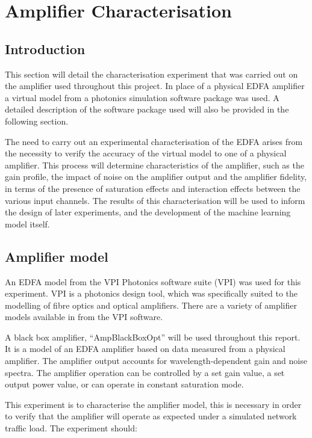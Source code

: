 \newpage
\section{Amplifier Characterisation}
\label{tw:sec:amp_char}


\subsection{Introduction}
This section will detail the characterisation experiment that was carried out on the amplifier used throughout this project. In place of a physical EDFA amplifier a virtual model from a photonics simulation software package was used. A detailed description of the software package used will also be provided in the following section.	

The need to carry out an experimental characterisation of the EDFA arises from the necessity to verify the accuracy of the virtual model to one of a physical amplifier. This process will determine characteristics of the amplifier, such as the gain profile, the impact of noise on the amplifier output and the amplifier fidelity, in terms of the presence of saturation effects and interaction effects between the various input channels. The results of this characterisation will be used to inform the design of later experiments, and the development of the machine learning model itself.

\subsection{Amplifier model}
An EDFA model from the VPI Photonics software suite (VPI) was used for this experiment. VPI is a photonics design tool, which was specifically suited to the modelling of fibre optics and optical amplifiers. There are a variety of amplifier models available in from the VPI software. 

A black box amplifier, “AmpBlackBoxOpt” will be used throughout this report. It is a model of an EDFA amplifier based on data measured from a physical amplifier. The amplifier output accounts for wavelength-dependent gain and noise spectra. The amplifier operation can be controlled by a set gain value, a set output power value, or can operate in constant saturation mode.

This experiment is to characterise the amplifier model, this is necessary in order to verify that the amplifier will operate as expected under a simulated network traffic load.  The experiment should:

